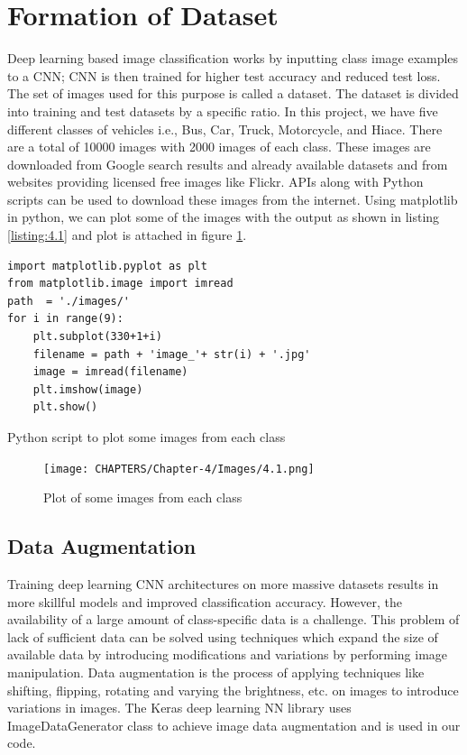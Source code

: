 \section{Formation of Dataset}
Deep learning based image classification works by inputting class
image examples to a CNN; CNN is then trained for higher test accuracy
and reduced test loss. The set of images used for this purpose is
called a dataset.
The dataset is divided into training and test datasets by a specific ratio.
In this project, we have five different classes of vehicles i.e., Bus, Car, Truck, Motorcycle, and Hiace. There are a total of 10000 images with 2000 images of each class. These images are downloaded from Google search results and already available
datasets and from websites providing licensed free images like Flickr.
APIs along with Python
scripts can be used to download these images from the internet.
Using matplotlib in python, we can plot some of the images with the output as
shown in listing \ref{listing:4.1} and plot is attached in figure
\ref{fig:4.1}.
\linespread{1.0}
\begin{listing}[H]
\begin{verbatim}
import matplotlib.pyplot as plt
from matplotlib.image import imread  
path  = './images/'
for i in range(9):
    plt.subplot(330+1+i)
    filename = path + 'image_'+ str(i) + '.jpg'
    image = imread(filename)
    plt.imshow(image)    
    plt.show()
\end{verbatim}
\caption{Python script to plot some images from each class}
\label{listing:4.1}
\end{listing}

\begin{figure}[H]
    \centering
    \captionsetup{justification = centering}
    \texttt{[image: CHAPTERS/Chapter-4/Images/4.1.png]}
    \caption{Plot of some images from each class} 
    \label{fig:4.1}
  \end{figure}

\subsection{Data Augmentation}
Training deep learning CNN architectures on more massive datasets
results in more skillful models and improved classification accuracy.
However, the availability of a large amount of class-specific data is a challenge.
This problem of lack of sufficient data can be solved using
techniques which expand the size of available data by introducing
modifications and variations by performing image manipulation.
Data augmentation is the process of applying techniques like shifting, 
flipping, rotating and varying the brightness, etc. on images to
introduce variations in images. The Keras deep learning NN library uses
ImageDataGenerator
class to achieve image data augmentation and is used in our code.

